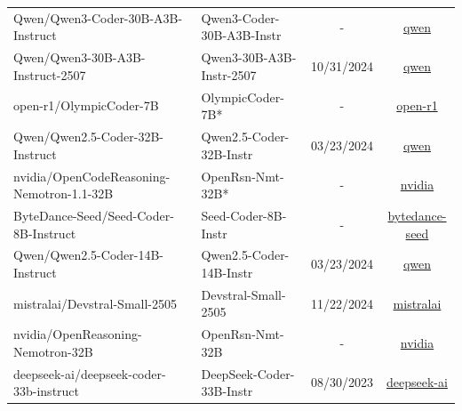 \begin{table}[hbt]
{\begin{tabular}{*{2}{l} *{2}{c}}
\rowcolor{gray!10}
Qwen/Qwen3-Coder-30B-A3B-Instruct      & Qwen3-Coder-30B-A3B-Instr & - &\href{https://huggingface.co/Qwen/Qwen3-Coder-30B-A3B-Instruct}{qwen} \\
Qwen/Qwen3-30B-A3B-Instruct-2507       & Qwen3-30B-A3B-Instr-2507 & 10/31/2024 & \href{https://huggingface.co/Qwen/Qwen3-30B-A3B-Instruct-2507}{qwen}\\
\rowcolor{gray!10}
open-r1/OlympicCoder-7B           & OlympicCoder-7B* & - &\href{https://huggingface.co/open-r1/OlympicCoder-7B}{open-r1} \\
Qwen/Qwen2.5-Coder-32B-Instruct         & Qwen2.5-Coder-32B-Instr&03/23/2024&\href{https://huggingface.co/Qwen/Qwen2.5-Coder-32B-Instruct}{qwen}\\
\rowcolor{gray!10}
nvidia/OpenCodeReasoning-Nemotron-1.1-32B      &OpenRsn-Nmt-32B* & - & \href{https://huggingface.co/nvidia/OpenCodeReasoning-Nemotron-1.1-32B}{nvidia} \\
ByteDance-Seed/Seed-Coder-8B-Instruct            & Seed-Coder-8B-Instr & - &\href{https://huggingface.co/ByteDance-Seed/Seed-Coder-8B-Instruct}{bytedance-seed}\\
\rowcolor{gray!10}
Qwen/Qwen2.5-Coder-14B-Instruct        & Qwen2.5-Coder-14B-Instr & 03/23/2024 &\href{https://huggingface.co/Qwen/Qwen2.5-Coder-14B-Instruct}{qwen}  \\
mistralai/Devstral-Small-2505            & Devstral-Small-2505 & 11/22/2024 & \href{https://huggingface.co/mistralai/Devstral-Small-2505}{mistralai} \\
\rowcolor{gray!10}
nvidia/OpenReasoning-Nemotron-32B & OpenRsn-Nmt-32B & -&\href{https://huggingface.co/nvidia/OpenReasoning-Nemotron-32B}{nvidia}\\
deepseek-ai/deepseek-coder-33b-instruct       &  DeepSeek-Coder-33B-Instr & 08/30/2023 & \href{https://huggingface.co/deepseek-ai/deepseek-coder-33b-instruct}{deepseek-ai} \\
\bottomrule
\end{tabular}%
}
\end{table}